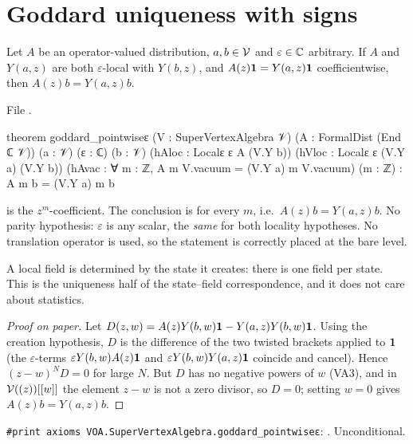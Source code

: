 \section{Goddard uniqueness with signs}\label{l17:sec:goddard}

\begin{theorem}\label{l17:thm:goddardpt}
Let $A$ be an operator-valued distribution, $a,b\in\mathcal{V}$ and $\varepsilon\in{\mathbb{C}}$ arbitrary. If
$A$ and $Y(a,z)$ are both $\varepsilon$-local with $Y(b,z)$, and $A(z)\mathbf{1}=Y(a,z)\mathbf{1}$
coefficientwise, then $A(z)b=Y(a,z)b$.
\end{theorem}
\noindent File .
\begin{leancode}
theorem goddard_pointwiseε (V : SuperVertexAlgebra 𝒱) (A : FormalDist (End ℂ 𝒱)) (a : 𝒱)
    (ε : ℂ) (b : 𝒱) (hAloc : Localε ε A (V.Y b)) (hVloc : Localε ε (V.Y a) (V.Y b))
    (hAvac : ∀ m : ℤ, A m V.vacuum = (V.Y a) m V.vacuum) (m : ℤ) :
    A m b = (V.Y a) m b
\end{leancode}
\begin{dictionary}
 is the $z^m$-coefficient. The conclusion is for every $m$, i.e.\ $A(z)b=Y(a,z)b$. No
parity hypothesis: $\varepsilon$ is any scalar, the \emph{same} for both locality hypotheses. No
translation operator is used, so the statement is correctly placed at the bare level.
\end{dictionary}
\begin{physics}
A local field is determined by the state it creates: there is one field per state. This is the
uniqueness half of the state--field correspondence, and it does not care about statistics.
\end{physics}
\begin{proof}[Proof on paper]
Let $D(z,w)=A(z)Y(b,w)\mathbf{1}-Y(a,z)Y(b,w)\mathbf{1}$. Using the creation hypothesis,
$D$ is the difference of the two twisted brackets applied to $\mathbf{1}$ (the $\varepsilon$-terms
$\varepsilon Y(b,w)A(z)\mathbf{1}$ and $\varepsilon Y(b,w)Y(a,z)\mathbf{1}$ coincide and
cancel). Hence $(z-w)^ND=0$ for large $N$. But $D$ has no negative powers of $w$ (VA3), and in
$\mathcal{V}((z))[[w]]$ the element $z-w$ is not a zero divisor, so $D=0$; setting $w=0$ gives
$A(z)b=Y(a,z)b$.
\end{proof}
\begin{status}
\texttt{\#print axioms VOA.SuperVertexAlgebra.goddard\_pointwiseε}: . Unconditional.
\end{status}

